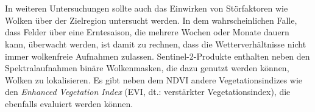 \\\\
In weiteren Untersuchungen sollte auch das Einwirken von Störfaktoren wie Wolken über der Zielregion untersucht werden. In dem wahrscheinlichen Falle, dass Felder über eine Erntesaison, die mehrere Wochen oder Monate dauern kann, überwacht werden, ist damit zu rechnen, dass die Wetterverhältnisse nicht immer wolkenfreie Aufnahmen zulassen. Sentinel-2-Produkte enthalten neben den Spektralaufnahmen binäre Wolkenmasken, die dazu genutzt werden können, Wolken zu lokalisieren. Es gibt neben dem NDVI andere Vegetationsindizes wie den \textit{Enhanced Vegetation Index} (EVI, dt.: verstärkter Vegetationsindex), die ebenfalls evaluiert werden können.
\\\\
